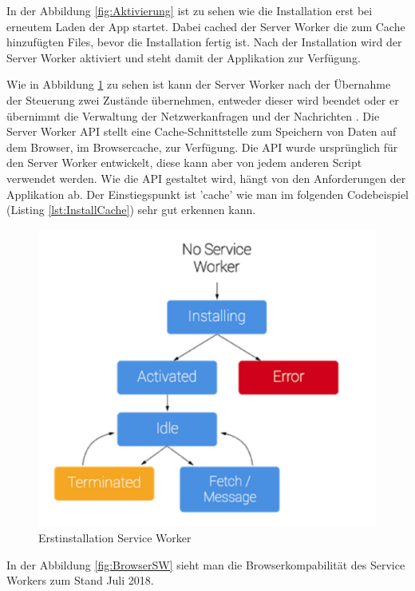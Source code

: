 In der Abbildung \ref{fig:Aktivierung} ist zu sehen wie die Installation erst bei erneutem Laden der App startet. Dabei cached der Server Worker die zum Cache hinzufügten Files, bevor die Installation fertig ist.
Nach der Installation wird der Server Worker aktiviert und steht damit der Applikation zur Verfügung.


Wie in Abbildung \ref{fig:Erstinstallation} zu sehen ist kann der Server Worker nach der Übernahme der Steuerung zwei Zustände übernehmen, entweder dieser wird beendet oder er übernimmt die Verwaltung der Netzwerkanfragen und der Nachrichten \cite{ServiceWorkerRegistration}.
Die Server Worker API stellt eine Cache-Schnittstelle zum Speichern von Daten auf dem Browser, im Browsercache, zur Verfügung. Die API wurde ursprünglich für den Server Worker entwickelt, diese kann aber von jedem anderen Script verwendet werden. 
Wie die API gestaltet wird, hängt von den Anforderungen der Applikation ab.
Der Einstiegspunkt ist 'cache' wie man im folgenden Codebeispiel (Listing \ref{lst:InstallCache}) sehr gut erkennen kann.

\begin{figure}[H]
	\centering
	\includegraphics[width=14cm]{BilderAllgemein/InstallSW}\medskip
	\caption{Erstinstallation Service Worker \cite{ServiceWorkerRegistration}}
	\label{fig:Erstinstallation}
\end{figure}

\newpage
In der Abbildung \ref{fig:BrowserSW} sieht man die Browserkompabilität des Service Workers zum Stand Juli 2018.



